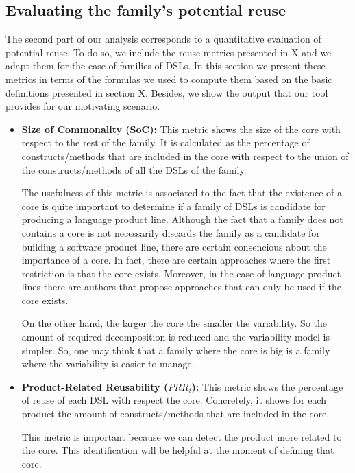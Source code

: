 \subsection{Evaluating the family's potential reuse}

The second part of our analysis corresponds to a quantitative evaluation of potential reuse. To do so, we include the reuse metrics presented in X and we adapt them for the case of families of DSLs. In this section we present these metrics in terms of the formulas we used to compute them based on the basic definitions presented in section X. Besides, we show the output that our tool provides for our motivating scenario. 

\begin{itemize}
\item \textbf{Size of Commonality (SoC):} This metric shows the size of the core with respect to the rest of the family. It is calculated as the percentage of constructs/methods that are included in the core with respect to the union of the constructs/methods of all the DSLs of the family.

\hspace{3mm} The usefulness of this metric is associated to  the fact that the existence of a core is quite important to determine if a family of DSLs is candidate for producing a language product line. Although the fact that a family does not contains a core is not necessarily discards the family as a candidate for building a software product line, there are certain consencious about the importance of a core. In fact, there are certain approaches where the first restriction is that the core exists. Moreover, in the case of language product lines there are authors that propose approaches that can only be used if the core exists. 

\hspace{3mm} On the other hand, the larger the core the smaller the variability. So the amount of required decomposition is reduced and the variability model is simpler. So, one may think that a family where the core is big is a family where the variability is easier to manage. 

\vspace{2mm}
\item \textbf{Product-Related Reusability ($PRR_i$):}
This metric shows the percentage of reuse of each DSL with respect the core. Concretely, it shows for each product the amount of constructs/methods that are included in the core.

\hspace{3mm} This metric is important because we can detect the product more related to the core. This identification will be helpful at the moment of defining that core. 


\end{itemize}
